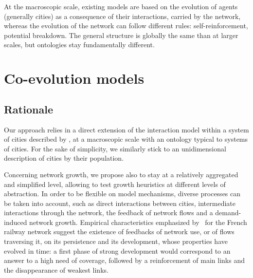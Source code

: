 
At the macroscopic scale, existing models are based on the evolution of agents (generally cities) as a consequence of their interactions, carried by the network, whereas the evolution of the network can follow different rules: self-reinforcement, potential breakdown. The general structure is globally the same than at larger scales, but ontologies stay fundamentally different.





\section{Co-evolution models}



\subsection{Rationale}

Our approach relies in a direct extension of the interaction model within a system of cities described by \cite{raimbault2018indirect}, at a macroscopic scale with an ontology typical to systems of cities. For the sake of simplicity, we similarly stick to an unidimensional description of cities by their population.


Concerning network growth, we propose also to stay at a relatively aggregated and simplified level, allowing to test growth heuristics at different levels of abstraction. In order to be flexible on model mechanisms, diverse processes can be taken into account, such as direct interactions between cities, intermediate interactions through the network, the feedback of network flows and a demand-induced network growth. Empirical characteristics emphasized by~\cite{thevenin2013mapping} for the French railway network suggest the existence of feedbacks of network use, or of flows traversing it, on its persistence and its development, whose properties have evolved in time: a first phase of strong development would correspond to an answer to a high need of coverage, followed by a reinforcement of main links and the disappearance of weakest links.



